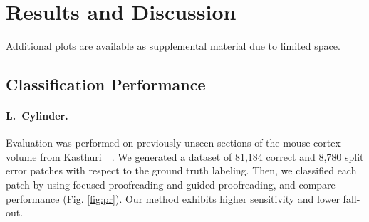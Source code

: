 \section{Results and Discussion}

Additional plots are available as supplemental material due to limited space. 

\subsection{Classification Performance}

\paragraph{L.~Cylinder.} Evaluation was performed on previously unseen sections of the mouse cortex volume from Kasthuri~\etal~\cite{kasthuri2015saturated}. We generated a dataset of 81,184 correct and 8,780 split error patches with respect to the ground truth labeling. Then, we classified each patch by using focused proofreading and guided proofreading, and compare performance (Fig. \ref{fig:pr}). Our method exhibits higher sensitivity and lower fall-out.%


